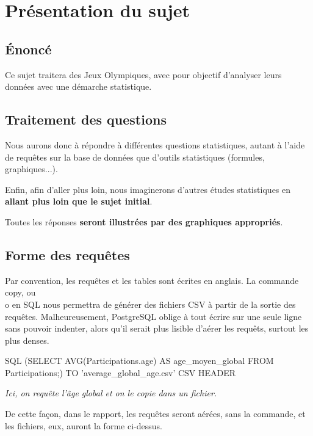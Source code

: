 \documentclass{mytex}
\begin{document}
\section{Présentation du sujet}

\subsection{Énoncé}

Ce sujet traitera des Jeux Olympiques, avec pour objectif d'analyser leurs données avec une démarche statistique.

\subsection{Traitement des questions}

Nous aurons donc à répondre à différentes questions statistiques, autant à l'aide de requêtes sur la base de données que d'outils statistiques (formules, graphiques...).

Enfin, afin d'aller plus loin, nous imaginerons d'autres études statistiques en \textbf{allant plus loin que le sujet initial}.

Toutes les réponses \textbf{seront illustrées par des graphiques appropriés}.

\subsection{Forme des requêtes}

Par convention, les requêtes et les tables sont écrites en anglais.
La commande \\copy, ou \\o en SQL nous permettra de générer des fichiers CSV à partir de la sortie des requêtes.
Malheureusement, PostgreSQL oblige à tout écrire sur une seule ligne sans pouvoir indenter, alors qu'il serait plus lisible d'aérer les requêts, surtout les plus denses.

\begin{codeboxlang}{SQL}
\copy (SELECT AVG(Participations.age) AS age_moyen_global FROM Participations;) TO 'average_global_age.csv' CSV HEADER
\end{codeboxlang}


\emph{Ici, on requête l'âge global et on le copie dans un fichier.}

De cette façon, dans le rapport, les requêtes seront aérées, sans la commande, et les fichiers, eux, auront la forme ci-dessus.
\end{document}
